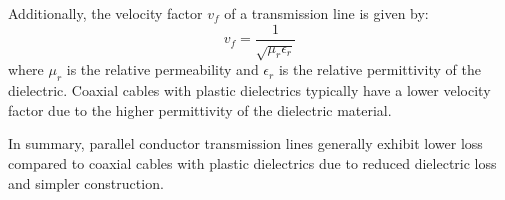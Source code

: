 Additionally, the velocity factor \( v_f \) of a transmission line is given by:
\[
v_f = \frac{1}{\sqrt{\mu_r \epsilon_r}}
\]
where \( \mu_r \) is the relative permeability and \( \epsilon_r \) is the relative permittivity of the dielectric. Coaxial cables with plastic dielectrics typically have a lower velocity factor due to the higher permittivity of the dielectric material.

In summary, parallel conductor transmission lines generally exhibit lower loss compared to coaxial cables with plastic dielectrics due to reduced dielectric loss and simpler construction.

